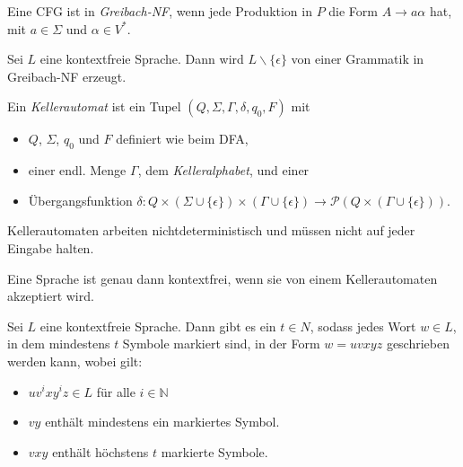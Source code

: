 \documentclass{cheat-sheet}
\begin{document}

\begin{defn}
Eine CFG ist in \emph{Greibach-NF}, wenn jede Produktion in $P$ die Form $A \longrightarrow a \alpha$ hat, mit $a \in \Sigma$ und $\alpha \in V^{*}$.
\end{defn}

\begin{satz}
Sei $L$ eine kontextfreie Sprache. Dann wird $L \backslash \{ \epsilon \}$ von einer Grammatik in Greibach-NF erzeugt.
\end{satz}

\begin{defn}
Ein \emph{Kellerautomat} ist ein Tupel $(Q, \Sigma, \Gamma, \delta, q_{0}, F)$ mit

\begin{itemize}
  \item $Q$, $\Sigma$, $q_{0}$ und $F$ definiert wie beim DFA,
  \item einer endl. Menge $\Gamma$, dem \emph{Kelleralphabet}, und einer
  \item Übergangsfunktion $\delta : Q {\times} (\Sigma \cup \{ \epsilon \}) {\times} (\Gamma \cup \{ \epsilon \}) \to \mathcal{P}(Q {\times} (\Gamma \cup \{ \epsilon \}))$.
\end{itemize}
\end{defn}

\begin{bem}
Kellerautomaten arbeiten nichtdeterministisch und müssen nicht auf jeder Eingabe halten.
\end{bem}


\begin{satz}
Eine Sprache ist genau dann kontextfrei, wenn sie von einem Kellerautomaten akzeptiert wird.
\end{satz}


\begin{satz}
Sei $L$ eine kontextfreie Sprache. Dann gibt es ein $t \in N$, sodass jedes Wort $w \in L$, in dem mindestens $t$ Symbole markiert sind, in der Form $w = uvxyz$ geschrieben werden kann, wobei gilt:

\begin{itemize}
  \item $uv^{i}xy^{i}z \in L$ für alle $i \in \mathbb{N}$
  \item $vy$ enthält mindestens ein markiertes Symbol.
  \item $vxy$ enthält höchstens $t$ markierte Symbole.
\end{itemize}
\end{satz}
\end{document}
